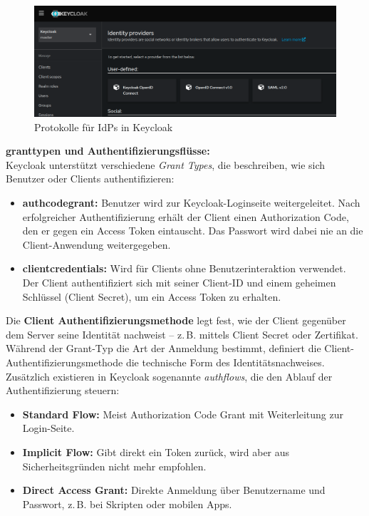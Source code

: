 \documentclass[a4paper,12pt]{article}
\begin{document}
	\begin{figure}[H]
		\centering
		\includegraphics[width=0.9\linewidth]{Bilder/screenshot007}
		\caption{Protokolle für IdPs in Keycloak}
		\label{fig:screenshot007}
	\end{figure}
	
	\vspace{0.5em}
	\textbf{\gls{granttype}n und Authentifizierungsflüsse:}\\
	Keycloak unterstützt verschiedene \textit{Grant Types}, die beschreiben, wie sich Benutzer oder Clients authentifizieren:
	
	\begin{itemize}
		\item \textbf{\gls{authcodegrant}:} Benutzer wird zur Keycloak-Loginseite weitergeleitet. Nach erfolgreicher Authentifizierung erhält der Client einen Authorization Code, den er gegen ein Access Token eintauscht. Das Passwort wird dabei nie an die Client-Anwendung weitergegeben.
		\item \textbf{\gls{clientcredentials}:} Wird für Clients ohne Benutzerinteraktion verwendet. Der Client authentifiziert sich mit seiner Client-ID und einem geheimen Schlüssel (Client Secret), um ein Access Token zu erhalten.
	\end{itemize}
	Die \textbf{Client Authentifizierungsmethode} legt fest, wie der Client gegenüber dem Server seine Identität nachweist – z.\,B. mittels Client Secret oder Zertifikat. Während der Grant-Typ die Art der Anmeldung bestimmt, definiert die Client-Authentifizierungsmethode die technische Form des Identitätsnachweises.
	\\[0.5em]
	Zusätzlich existieren in Keycloak sogenannte \textit{\gls{authflow}s}, die den Ablauf der Authentifizierung steuern:
	
	\begin{itemize}
		\item \textbf{Standard Flow:} Meist Authorization Code Grant mit Weiterleitung zur Login-Seite.
		\item \textbf{Implicit Flow:} Gibt direkt ein Token zurück, wird aber aus Sicherheitsgründen nicht mehr empfohlen.
		\item \textbf{Direct Access Grant:} Direkte Anmeldung über Benutzername und Passwort, z.\,B. bei Skripten oder mobilen Apps.
	\end{itemize}
	
\end{document}
